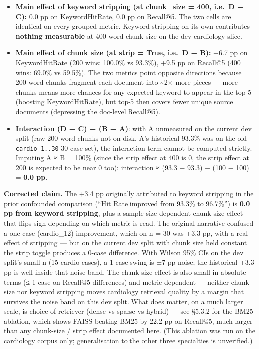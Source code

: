 \documentclass[
  american,
  a4paper,
]{article}
\providecommand{\tightlist}{%
  \setlength{\itemsep}{0pt}\setlength{\parskip}{0pt}}
\begin{document}
\begin{itemize}
\tightlist
\item
  \textbf{Main effect of keyword stripping (at chunk\_size = 400, i.e.~D
  − C):} 0.0 pp on KeywordHitRate, 0.0 pp on Recall@5. The two cells are
  identical on every grouped metric. Keyword stripping on its own
  contributes \textbf{nothing measurable} at 400-word chunk size on the
  dev cardiology slice.
\item
  \textbf{Main effect of chunk size (at strip = True, i.e.~D − B):} −6.7
  pp on KeywordHitRate (200 wins: 100.0\% vs 93.3\%), +9.5 pp on
  Recall@5 (400 wins: 69.0\% vs 59.5\%). The two metrics point opposite
  directions because 200-word chunks fragment each document into
  \textasciitilde2× more pieces --- more chunks means more chances for
  any expected keyword to appear in the top-5 (boosting KeywordHitRate),
  but top-5 then covers fewer unique source documents (depressing the
  doc-level Recall@5).
\item
  \textbf{Interaction (D − C) − (B − A):} with A unmeasured on the
  current dev split (raw 200-word chunks not on disk, A's historical
  93.3\% was on the old \texttt{cardio\_1..30} 30-case set), the
  interaction term cannot be computed strictly. Imputing A ≈ B = 100\%
  (since the strip effect at 400 is 0, the strip effect at 200 is
  expected to be near 0 too): interaction ≈ (93.3 − 93.3) − (100 − 100)
  = \textbf{0.0 pp}.
\end{itemize}

\textbf{Corrected claim.} The +3.4 pp originally attributed to keyword
stripping in the prior confounded comparison (``Hit Rate improved from
93.3\% to 96.7\%'') is \textbf{0.0 pp from keyword stripping}, plus a
sample-size-dependent chunk-size effect that flips sign depending on
which metric is read. The original narrative confused a one-case
(cardio\_12) improvement, which on n = 30 was +3.3 pp, with a real
effect of stripping --- but on the current dev split with chunk size
held constant the strip toggle produces a 0-case difference. With Wilson
95\% CIs on the dev split's small n (15 cardio cases), a 1-case swing is
±7 pp noise; the historical +3.3 pp is well inside that noise band. The
chunk-size effect is also small in absolute terms (≤ 1 case on Recall@5
differences) and metric-dependent --- neither chunk size nor keyword
stripping moves cardiology retrieval quality by a margin that survives
the noise band on this dev split. What does matter, on a much larger
scale, is choice of retriever (dense vs sparse vs hybrid) --- see §5.3.2
for the BM25 ablation, which shows FAISS beating BM25 by 22.2 pp on
Recall@5, much larger than any chunk-size / strip effect documented
here. (This ablation was run on the cardiology corpus only;
generalisation to the other three specialties is unverified.)
\end{document}
